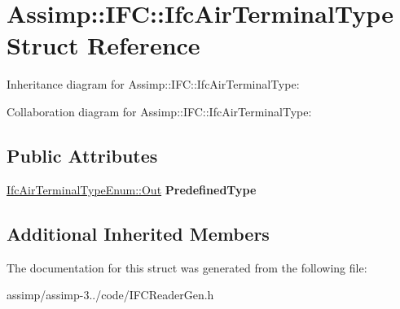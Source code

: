 \hypertarget{struct_assimp_1_1_i_f_c_1_1_ifc_air_terminal_type}{\section{Assimp\+:\+:I\+F\+C\+:\+:Ifc\+Air\+Terminal\+Type Struct Reference}
\label{struct_assimp_1_1_i_f_c_1_1_ifc_air_terminal_type}
}


Inheritance diagram for Assimp\+:\+:I\+F\+C\+:\+:Ifc\+Air\+Terminal\+Type\+:


Collaboration diagram for Assimp\+:\+:I\+F\+C\+:\+:Ifc\+Air\+Terminal\+Type\+:
\subsection*{Public Attributes}
\begin{DoxyCompactItemize}
\item 
\hypertarget{struct_assimp_1_1_i_f_c_1_1_ifc_air_terminal_type_a94c3b56a5199e4f267e9a150405a89c6}{\hyperlink{classboost_1_1shared__ptr}{Ifc\+Air\+Terminal\+Type\+Enum\+::\+Out} {\bfseries Predefined\+Type}}\label{struct_assimp_1_1_i_f_c_1_1_ifc_air_terminal_type_a94c3b56a5199e4f267e9a150405a89c6}

\end{DoxyCompactItemize}
\subsection*{Additional Inherited Members}


The documentation for this struct was generated from the following file\+:\begin{DoxyCompactItemize}
\item 
assimp/assimp-\/3../code/I\+F\+C\+Reader\+Gen.\+h\end{DoxyCompactItemize}
